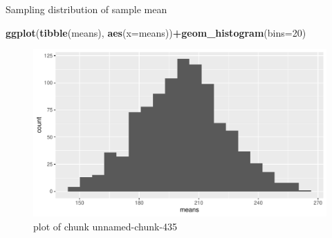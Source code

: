\documentclass[
  ignorenonframetext,
]{beamer}
\newenvironment{Shaded}{\begin{snugshade}}{\end{snugshade}}
\newcommand{\DataTypeTok}[1]{\textcolor[rgb]{0.13,0.29,0.53}{#1}}
\newcommand{\DecValTok}[1]{\textcolor[rgb]{0.00,0.00,0.81}{#1}}
\newcommand{\KeywordTok}[1]{\textcolor[rgb]{0.13,0.29,0.53}{\textbf{#1}}}
\newcommand{\NormalTok}[1]{#1}
\newcommand{\OperatorTok}[1]{\textcolor[rgb]{0.81,0.36,0.00}{\textbf{#1}}}
\begin{document}
\begin{frame}[fragile]{Sampling distribution of sample mean}
\protect\hypertarget{sampling-distribution-of-sample-mean}{}

\begin{Shaded}
\begin{Highlighting}[]
\KeywordTok{ggplot}\NormalTok{(}\KeywordTok{tibble}\NormalTok{(means), }\KeywordTok{aes}\NormalTok{(}\DataTypeTok{x=}\NormalTok{means))}\OperatorTok{+}\KeywordTok{geom_histogram}\NormalTok{(}\DataTypeTok{bins=}\DecValTok{20}\NormalTok{)}
\end{Highlighting}
\end{Shaded}

\begin{figure}
\centering
\includegraphics{figure/unnamed-chunk-435-1.pdf}
\caption{plot of chunk unnamed-chunk-435}
\end{figure}

\end{frame}
\end{document}
